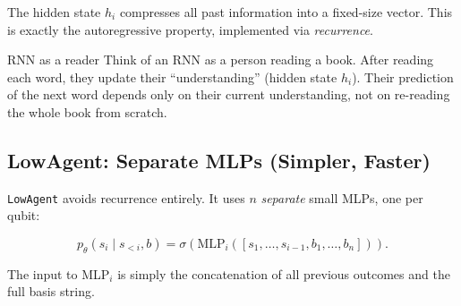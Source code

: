 \documentclass[11pt, a4paper]{article}
\begin{document}
The hidden state $h_i$ compresses all past information into a fixed-size
vector. This is exactly the autoregressive property, implemented via
\emph{recurrence}.

\begin{analogybox}{RNN as a reader}
Think of an RNN as a person reading a book. After reading each word, they
update their ``understanding'' (hidden state $h_i$). Their prediction of the
next word depends only on their current understanding, not on re-reading the
whole book from scratch.
\end{analogybox}

\subsection{LowAgent: Separate MLPs (Simpler, Faster)}

\texttt{LowAgent} avoids recurrence entirely. It uses $n$ \emph{separate}
small MLPs, one per qubit:

\begin{equation}
  p_\theta(s_i \mid s_{<i}, b) = \sigma\!\left(\mathrm{MLP}_i([s_1, \ldots, s_{i-1}, b_1, \ldots, b_n])\right).
\end{equation}

The input to MLP$_i$ is simply the concatenation of all previous outcomes
and the full basis string.
\end{document}
